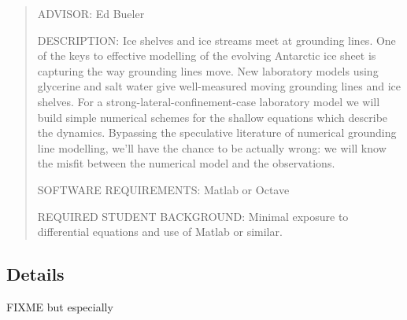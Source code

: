 \documentclass[11pt,final]{amsart}%
\begin{document}
\begin{quote}
\noindent ADVISOR: Ed Bueler

\medskip
\noindent DESCRIPTION:  Ice shelves and ice streams meet at grounding lines.  One of the keys to effective modelling of the evolving Antarctic ice sheet is capturing the way grounding lines move.  New laboratory models using glycerine and salt water give well-measured moving grounding lines and ice shelves.  For a strong-lateral-confinement-case laboratory model \citep{Pegleretal2013} we will build simple numerical schemes for the shallow equations which describe the dynamics.  Bypassing the speculative literature of numerical grounding line modelling, we'll have the chance to be actually wrong: we will know the misfit between the numerical model and the observations.

\medskip
\noindent SOFTWARE REQUIREMENTS: Matlab or Octave

\medskip
\noindent REQUIRED STUDENT BACKGROUND: Minimal exposure to differential equations and use of Matlab or similar.
\end{quote}

\subsection*{Details} FIXME  \cite{PeglerListerWorster2012,PeglerWorster2012,SayagPeglerWorster2012} but especially \cite{Pegleretal2013}

\small

\normalsize
\end{document}
